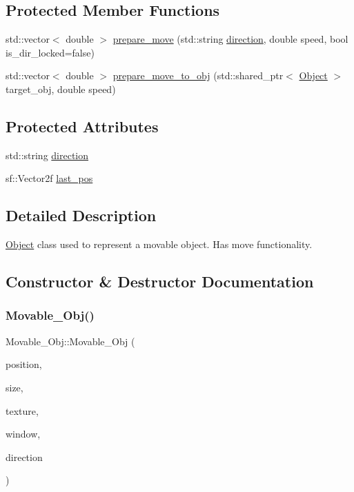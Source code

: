 \subsection*{Protected Member Functions}
\begin{DoxyCompactItemize}
\item 
std\+::vector$<$ double $>$ \hyperlink{classMovable__Obj_a33677e18516f55621b2e4b4a8f2d74f6}{prepare\+\_\+move} (std\+::string \hyperlink{classMovable__Obj_a4f4eb3171656831c1f0b8dbab2b2a00c}{direction}, double speed, bool is\+\_\+dir\+\_\+locked=false)
\item 
std\+::vector$<$ double $>$ \hyperlink{classMovable__Obj_aaf4c69106180fae90e0bc689707f334c}{prepare\+\_\+move\+\_\+to\+\_\+obj} (std\+::shared\+\_\+ptr$<$ \hyperlink{classObject}{Object} $>$ target\+\_\+obj, double speed)
\end{DoxyCompactItemize}
\subsection*{Protected Attributes}
\begin{DoxyCompactItemize}
\item 
std\+::string \hyperlink{classMovable__Obj_a4f4eb3171656831c1f0b8dbab2b2a00c}{direction}
\item 
sf\+::\+Vector2f \hyperlink{classMovable__Obj_a934c481705983ca09c153d0cd65e4e1a}{last\+\_\+pos}
\end{DoxyCompactItemize}


\subsection{Detailed Description}
\hyperlink{classObject}{Object} class used to represent a movable object. Has move functionality. 

\subsection{Constructor \& Destructor Documentation}
\mbox{\label{classMovable__Obj_a0d1217bd80e75ac8499642bf0edba15d}} 
\subsubsection{\texorpdfstring{Movable\+\_\+\+Obj()}{Movable\_Obj()}}
{\footnotesize\ttfamily Movable\+\_\+\+Obj\+::\+Movable\+\_\+\+Obj (\begin{DoxyParamCaption}\item[{std\+::shared\+\_\+ptr$<$ sf\+::\+Vector2f $>$}]{position,  }\item[{std\+::shared\+\_\+ptr$<$ sf\+::\+Vector2f $>$}]{size,  }\item[{std\+::shared\+\_\+ptr$<$ sf\+::\+Texture $>$}]{texture,  }\item[{sf\+::\+Render\+Window $\ast$}]{window,  }\item[{std\+::string}]{direction }\end{DoxyParamCaption})}



